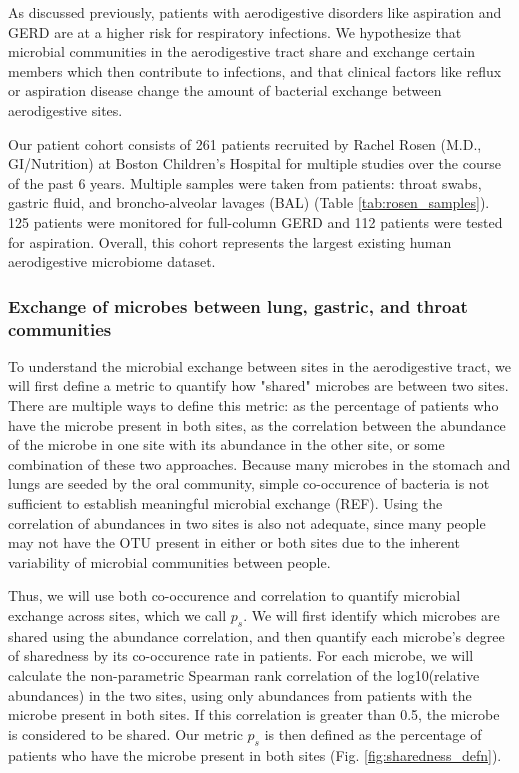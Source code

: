 \documentclass[12pt]{article}
\begin{document}
As discussed previously, patients with aerodigestive disorders like aspiration and GERD are at a higher risk for respiratory infections. We hypothesize that microbial communities in the aerodigestive tract share and exchange certain members which then contribute to infections, and that clinical factors like reflux or aspiration disease change the amount of bacterial exchange between aerodigestive sites.

Our patient cohort consists of 261 patients recruited by Rachel Rosen (M.D., GI/Nutrition) at Boston Children's Hospital for multiple studies over the course of the past 6 years. Multiple samples were taken from patients: throat swabs, gastric fluid, and broncho-alveolar lavages (BAL) (Table \ref{tab:rosen_samples}). 125 patients were monitored for full-column GERD and 112 patients were tested for aspiration. Overall, this cohort represents the largest existing human aerodigestive microbiome dataset.


\subsubsection{Exchange of microbes between lung, gastric, and throat communities} \label{sec:exchange}
To understand the microbial exchange between sites in the aerodigestive tract, we will first define a metric to quantify how "shared" microbes are between two sites. There are multiple ways to define this metric: as the percentage of patients who have the microbe present in both sites, as the correlation between the abundance of the microbe in one site with its abundance in the other site, or some combination of these two approaches. Because many microbes in the stomach and lungs are seeded by the oral community, simple co-occurence of bacteria is not sufficient to establish meaningful microbial exchange (REF). Using the correlation of abundances in two sites is also not adequate, since many people may not have the OTU present in either or both sites due to the inherent variability of microbial communities between people.

Thus, we will use both co-occurence and correlation to quantify microbial exchange across sites, which we call $p_s$. We will first identify which microbes are shared using the abundance correlation, and then quantify each microbe's degree of sharedness by its co-occurence rate in patients. For each microbe, we will calculate the non-parametric Spearman rank correlation of the log10(relative abundances) in the two sites, using only abundances from patients with the microbe present in both sites. If this correlation is greater than 0.5, the microbe is considered to be shared. Our metric $p_s$ is then defined as the percentage of patients who have the microbe present in both sites (Fig. \ref{fig:sharedness_defn}).
\end{document}
